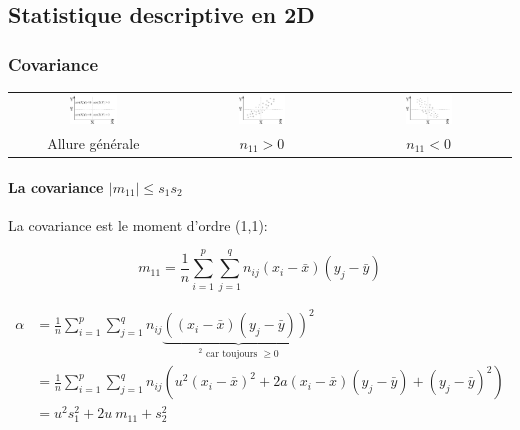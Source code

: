 \subsection{Statistique descriptive en 2D}


\subsubsection{Covariance}

\begin{center}
	\begin{tabular}{ccc}
		\includegraphics[width=0.3\textwidth]{images/covariance-all.pdf}&\includegraphics[width=0.3\textwidth]{images/covariance-positive.pdf}&\includegraphics[width=0.3\textwidth]{images/covariance-negative.pdf}\\
		Allure générale&$n_{11}>0$&$n_{11}<0$
	\end{tabular}
\end{center}





\paragraph{La covariance $|m_{11}| \leq s_1s_2$}

La covariance est le moment d'ordre (1,1):

$$m_{11}=\frac{1}{n} \sum_{i=1}^{p} \sum_{j=1}^{q} n_{ij} (x_i-\bar{x})(y_j-\bar{y})$$

\begin{align*}
	\alpha  &= \frac{1}{n} \sum_{i=1}^{p} \sum_{j=1}^{q} n_{ij} \underbrace{ ((x_i-\bar{x})(y_j-\bar{y}))^2 }_\text{$^2$ car toujours $\geq 0$} \\
	        &= \frac{1}{n} \sum_{i=1}^{p} \sum_{j=1}^{q} n_{ij} (u^2(x_i-\bar{x})^2 + 2a(x_i-\bar{x})(y_j-\bar{y})+(y_j-\bar{y})^2)\\
	        &= u^2s_1^2+2u\ m_{11}+s_2^2
\end{align*}

